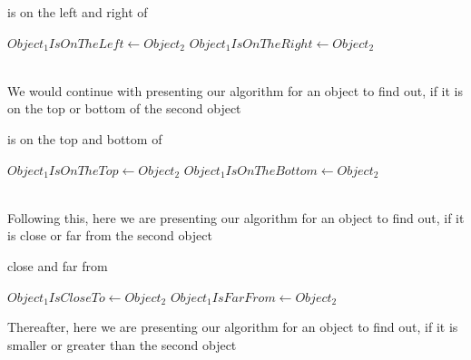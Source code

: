 \documentclass[12pt]{article}
\begin{document}
\begin{algorithm}
  \caption{is on the left and right of}\label{algo:algo}
  \begin{algorithmic}[1]
        \STATE $Object_1 Is On The Left
\gets Object_2$
\ELSE
                \STATE $Object_1 Is On The Right
\gets Object_2$
        \ENDIF
\ENDIF   
  \end{algorithmic}
\end{algorithm}
\\We would continue with presenting our algorithm for an object to find out, if it is on the top or bottom of the second object\\
\begin{algorithm}
  \caption{is on the top and bottom of}\label{algo:algo}
  \begin{algorithmic}[1]
        \STATE $Object_1 Is On The Top
\gets Object_2$
\ELSE
                \STATE $Object_1 Is On The Bottom
\gets Object_2$
        \ENDIF
\ENDIF   
  \end{algorithmic}
\end{algorithm}
\\Following this, here we are presenting our algorithm for an object to find out, if it is close or far from the second object\\
\begin{algorithm}
  \caption{close and far from}\label{algo:algo}
  \begin{algorithmic}[1]
        \STATE $Object_1 Is Close To
\gets Object_2$
\ELSE
                \STATE $Object_1 Is Far From
\gets Object_2$
        \ENDIF
\ENDIF   
  \end{algorithmic}
\end{algorithm}
\newpage
Thereafter, here we are presenting our algorithm for an object to find out, if it is smaller or greater than the second object
\end{document}
